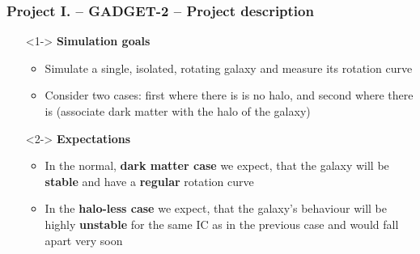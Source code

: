 \begin{frame}
\frametitle{Project I. -- GADGET-2 -- Project description}

\begin{itemize}
	\item[]<1-> \textbf{Simulation goals}
	\begin{itemize}
		\item<1-> Simulate a single, isolated, rotating galaxy and measure its rotation curve
		\item<1-> Consider two cases: first where there is is no halo, and second where there is (associate dark matter with the halo of the galaxy)
	\end{itemize}
	\item[]<2-> \textbf{Expectations}
	\begin{itemize}
		\item<2-> In the normal, \textbf{dark matter case} we expect, that the galaxy will be \textbf{stable} and have a \textbf{regular} rotation curve
		\item<2-> In the \textbf{halo-less case} we expect, that the galaxy's behaviour will be highly \textbf{unstable} for the same IC as in the previous case and would fall apart very soon
	\end{itemize}
\end{itemize}

\end{frame}
